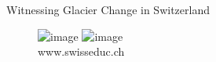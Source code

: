 \documentclass[hide notes,intlimits]{beamer}
\begin{document}


\begin{frame}{Witnessing Glacier Change in Switzerland}
      \begin{figure}
        \includegraphics<1>[width=\textwidth]{steigletscher-repeat-1994}
        \includegraphics<2>[width=\textwidth]{steigletscher-repeat-2006} 
        {\\ \footnotesize{www.swisseduc.ch}}
      \end{figure}
\end{frame}

{
}
\end{document}
